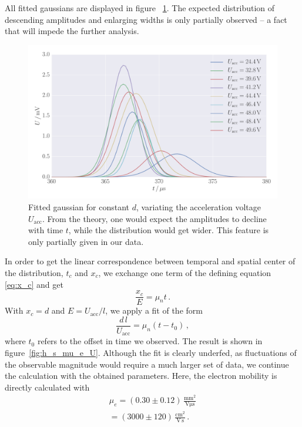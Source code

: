 All fitted gaussians are displayed in figure%
~\ref{fig:h_s_all_gauss_U}. The expected distribution of descending amplitudes 
and enlarging widths is only partially observed -- a fact that will impede the 
further analysis. 
\begin{figure}
    \includegraphics[width=1.0\textwidth]{figures/haynes_shockley_all_gauss_U}
    \caption{
        Fitted gaussian for constant $d$, variating the acceleration voltage 
        $U_\mathrm{acc}$. From the theory, one would expect the amplitudes to decline with 
        time $t$, while the distribution would get wider. This feature is only 
        partially given in our data. 
        }
    \label{fig:h_s_all_gauss_U}
\end{figure}
In order to get the linear correspondence between temporal and 
spatial center of the distribution, $t_c$ and $x_c$, we 
exchange one term of the defining equation \eqref{eq:x_c} and get 
\begin{equation}
    \frac{x_c}{E} = \mu_n t \, .
\end{equation}
With $x_c = d$ and $E = U_\mathrm{acc} / l$, we apply a fit of the form
\begin{equation}
    \frac{d \, l}{U_\mathrm{acc}} = \mu_n (t - t_0) \, ,
\end{equation}
where $t_0$ refers to the offset in time we observed. The result 
is shown in figure~\ref{fig:h_s_mu_e_U}. Although the fit is clearly underfed, 
as fluctuations of the observable magnitude would require a much larger 
set of data, we continue the calculation with the obtained parameters. 
Here, the electron mobility is directly calculated with 
\begin{equation}
    \begin{split}
        \mu_e   = (0.30 \pm 0.12)\, \mathrm{\frac{mm^2}{V\mu s}} \\
                = (3000 \pm 120)\, \mathrm{\frac{cm^2}{V\,s}} \,.
    \end{split}
\end{equation}
